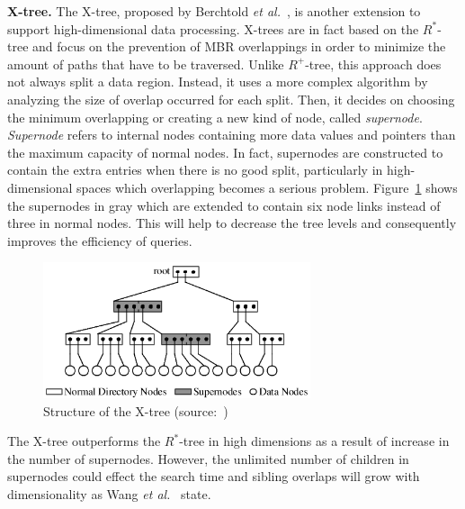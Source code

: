 \documentclass[a4paper,12pt]{article}
\begin{document}
\textbf{X-tree.}
The X-tree, proposed by Berchtold \emph{et al.}~\cite{xtree}, is another extension to support high-dimensional data processing. X-trees are in fact based on the $R^*$-tree and focus on the prevention of MBR overlappings in order to minimize the amount of paths that have to be traversed. Unlike $R^+$-tree, this approach does not always split a data region. Instead, it uses a more complex algorithm by analyzing the size of overlap occurred for each split. Then, it decides on choosing the minimum overlapping or creating a new kind of node, called \textit{supernode}. \textit{Supernode} refers to internal nodes containing more data values and pointers than the maximum capacity of normal nodes. In fact, supernodes are constructed to contain the extra entries when there is no good split, particularly in high-dimensional spaces which overlapping becomes a serious problem. Figure~\ref{figxtree} shows the supernodes in gray which are extended to contain six node links instead of three in normal nodes. This will help to decrease the tree levels and consequently improves the efficiency of queries.

\begin{figure}
\centering
\includegraphics[width=0.7\textwidth,height=0.19\textheight]{xtree}
\caption{Structure of the X-tree (source:~\cite{xtree})}
\label{figxtree}
\end{figure}

The X-tree outperforms the $R^*$-tree in high dimensions as a result of increase in the number of supernodes. However, the unlimited number of children in supernodes could effect the search time and sibling overlaps will grow with dimensionality as Wang \emph{et al.}~\cite{Wang98} state. 
\end{document}
